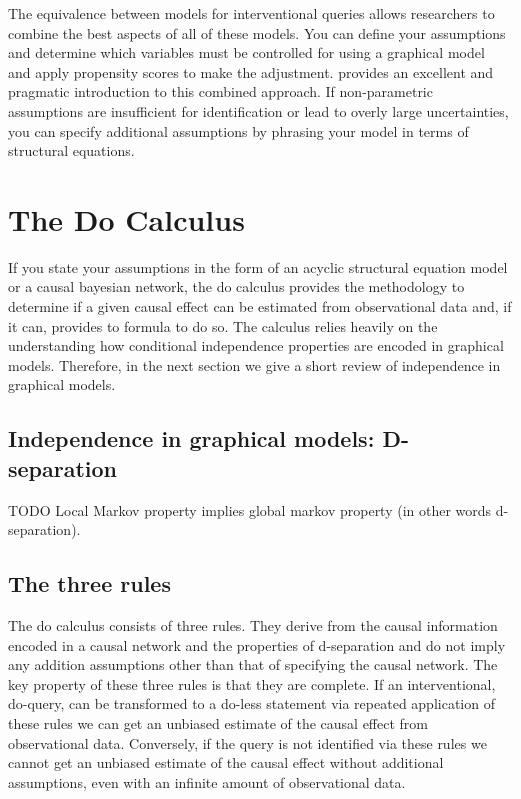 \documentclass[11pt,a4paper]{article}
\begin{document}
The equivalence between models for interventional queries allows researchers to combine the best aspects of all of these models. You can define your assumptions and determine which variables must be controlled for using a graphical model and apply propensity scores to make the adjustment. \cite{Morgan2007} provides an excellent and pragmatic introduction to this combined approach. If non-parametric assumptions are insufficient for identification or lead to overly large uncertainties, you can specify additional assumptions by phrasing your model in terms of structural equations. 




\section{The Do Calculus}
If you state your assumptions in the form of an acyclic structural equation model or a causal bayesian network, the do calculus provides the methodology to determine if a given causal effect can be estimated from observational data and, if it can, provides to formula to do so. The calculus relies heavily on the understanding how conditional independence properties are encoded in graphical models. Therefore, in the next section we give a short review of independence in graphical models.

\subsection{Independence in graphical models: D-separation}
TODO
Local Markov property implies global markov property (in other words d-separation). 

\subsection{The three rules}
The do calculus consists of three rules. They derive from the causal information encoded in a causal network and the properties of d-separation and do not imply any addition assumptions other than that of specifying the causal network. The key property of these three rules is that they are complete. If an interventional, do-query, can be transformed to a do-less statement via repeated application of these rules we can get an unbiased estimate of the causal effect from observational data. Conversely, if the query is not identified via these rules we cannot get an unbiased estimate of the causal effect without additional assumptions, even with an infinite amount of observational data. 
\end{document}
